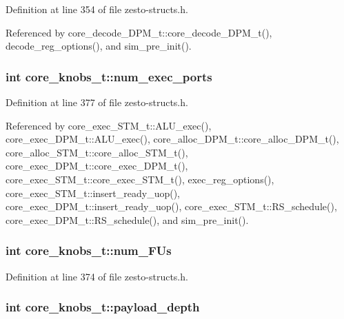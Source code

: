 Definition at line 354 of file zesto-structs.h.

Referenced by core\_\-decode\_\-DPM\_\-t::core\_\-decode\_\-DPM\_\-t(), decode\_\-reg\_\-options(), and sim\_\-pre\_\-init().
\subsubsection[{num\_\-exec\_\-ports}]{\setlength{\rightskip}{0pt plus 5cm}int {\bf core\_\-knobs\_\-t::num\_\-exec\_\-ports}}\label{structcore__knobs__t_92fc1674acee4fc2bed07ab13a058f7a}




Definition at line 377 of file zesto-structs.h.

Referenced by core\_\-exec\_\-STM\_\-t::ALU\_\-exec(), core\_\-exec\_\-DPM\_\-t::ALU\_\-exec(), core\_\-alloc\_\-DPM\_\-t::core\_\-alloc\_\-DPM\_\-t(), core\_\-alloc\_\-STM\_\-t::core\_\-alloc\_\-STM\_\-t(), core\_\-exec\_\-DPM\_\-t::core\_\-exec\_\-DPM\_\-t(), core\_\-exec\_\-STM\_\-t::core\_\-exec\_\-STM\_\-t(), exec\_\-reg\_\-options(), core\_\-exec\_\-STM\_\-t::insert\_\-ready\_\-uop(), core\_\-exec\_\-DPM\_\-t::insert\_\-ready\_\-uop(), core\_\-exec\_\-STM\_\-t::RS\_\-schedule(), core\_\-exec\_\-DPM\_\-t::RS\_\-schedule(), and sim\_\-pre\_\-init().
\subsubsection[{num\_\-FUs}]{\setlength{\rightskip}{0pt plus 5cm}int {\bf core\_\-knobs\_\-t::num\_\-FUs}}\label{structcore__knobs__t_201ac4dc34d48ddd8169d612456db64c}




Definition at line 374 of file zesto-structs.h.
\subsubsection[{payload\_\-depth}]{\setlength{\rightskip}{0pt plus 5cm}int {\bf core\_\-knobs\_\-t::payload\_\-depth}}\label{structcore__knobs__t_9d2834576ea4ae6471d9538548107973}




